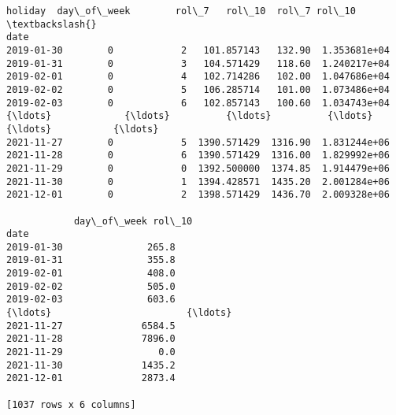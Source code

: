 \documentclass[11pt]{article}
\makeatletter
\newcommand{\boxspacing}{\kern\kvtcb@left@rule\kern\kvtcb@boxsep}
\newcommand{\prompt}[4]{
        {\ttfamily\llap{{\color{#2}[#3]:\hspace{3pt}#4}}\vspace{-\baselineskip}}
    }
\makeatother
\begin{document}
            \begin{tcolorbox}[breakable, size=fbox, boxrule=.5pt, pad at break*=1mm, opacityfill=0]
\prompt{Out}{outcolor}{159}{\boxspacing}
\begin{Verbatim}[commandchars=\\\{\}]
            holiday  day\_of\_week        rol\_7   rol\_10  rol\_7 rol\_10  \textbackslash{}
date
2019-01-30        0            2   101.857143   132.90  1.353681e+04
2019-01-31        0            3   104.571429   118.60  1.240217e+04
2019-02-01        0            4   102.714286   102.00  1.047686e+04
2019-02-02        0            5   106.285714   101.00  1.073486e+04
2019-02-03        0            6   102.857143   100.60  1.034743e+04
{\ldots}             {\ldots}          {\ldots}          {\ldots}      {\ldots}           {\ldots}
2021-11-27        0            5  1390.571429  1316.90  1.831244e+06
2021-11-28        0            6  1390.571429  1316.00  1.829992e+06
2021-11-29        0            0  1392.500000  1374.85  1.914479e+06
2021-11-30        0            1  1394.428571  1435.20  2.001284e+06
2021-12-01        0            2  1398.571429  1436.70  2.009328e+06

            day\_of\_week rol\_10
date
2019-01-30               265.8
2019-01-31               355.8
2019-02-01               408.0
2019-02-02               505.0
2019-02-03               603.6
{\ldots}                        {\ldots}
2021-11-27              6584.5
2021-11-28              7896.0
2021-11-29                 0.0
2021-11-30              1435.2
2021-12-01              2873.4

[1037 rows x 6 columns]
\end{Verbatim}
\end{tcolorbox}
        
\end{document}
